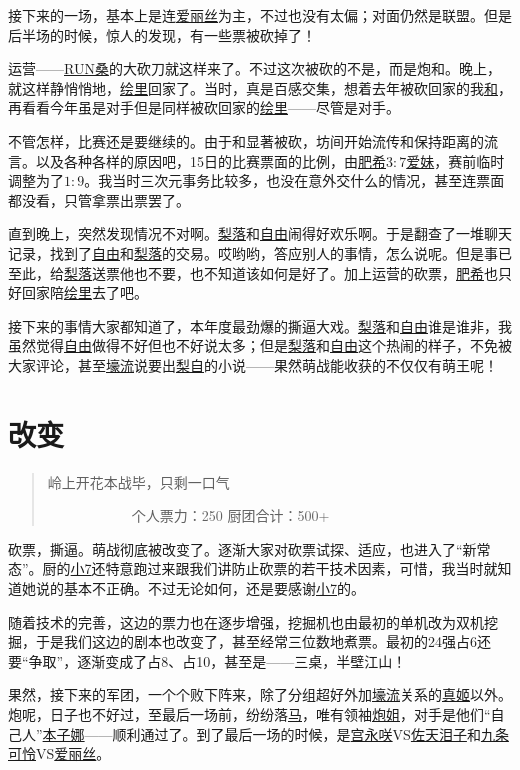 接下来的一场，基本上是连\uline{爱丽丝}为主，不过也没有太偏；对面仍然是联盟。但是后半场的时候，惊人的发现，有一些票被砍掉了！

运营——\uline{RUN桑}的大砍刀就这样来了。不过这次被砍的不是，而是炮和。晚上，就这样静悄悄地，\uline{绘里}回家了。当时，真是百感交集，想着去年被砍回家的我\uline{和}，再看看今年虽是对手但是同样被砍回家的\uline{绘里}——尽管是对手。

不管怎样，比赛还是要继续的。由于和显著被砍，坊间开始流传和保持距离的流言。以及各种各样的原因吧，15日的比赛票面的比例，由\uline{肥希}$3:7$\uline{爱妹}，赛前临时调整为了$1:9$。我当时三次元事务比较多，也没在意外交什么的情况，甚至连票面都没看，只管拿票出票罢了。

直到晚上，突然发现情况不对啊。\uline{梨落}和\uline{自由}闹得好欢乐啊。于是翻查了一堆聊天记录，找到了\uline{自由}和\uline{梨落}的交易。哎哟哟，答应别人的事情，怎么说呢。但是事已至此，给\uline{梨落}送票他也不要，也不知道该如何是好了。加上运营的砍票，\uline{肥希}也只好回家陪\uline{绘里}去了吧。

接下来的事情大家都知道了，本年度最劲爆的撕逼大戏。\uline{梨落}和\uline{自由}谁是谁非，我虽然觉得\uline{自由}做得不好但也不好说太多；但是\uline{梨落}和\uline{自由}这个热闹的样子，不免被大家评论，甚至\uline{壕流}说要出\uline{梨}\uline{自}的小说——果然萌战能收获的不仅仅有萌王呢！

\chapter{改变}
\begin{quote}
岭上开花本战毕，只剩一口气

　　　　　　个人票力：250 厨团合计：500+
\end{quote}

砍票，撕逼。萌战彻底被改变了。逐渐大家对砍票试探、适应，也进入了“新常态”。厨的\uline{小7}还特意跑过来跟我们讲防止砍票的若干技术因素，可惜，我当时就知道她说的基本不正确。不过无论如何，还是要感谢\uline{小7}的。

随着技术的完善，这边的票力也在逐步增强，挖掘机也由最初的单机改为双机挖掘，于是我们这边的剧本也改变了，甚至经常三位数地煮票。最初的24强占6还要“争取”，逐渐变成了占8、占10，甚至是——三桌，半壁江山！

果然，接下来的军团，一个个败下阵来，除了分组超好外加\uline{壕流}关系的\uline{真姬}以外。炮呢，日子也不好过，至最后一场前，纷纷落\uline{马}，唯有领袖\uline{炮姐}，对手是他们“自己人”\uline{本子娜}——顺利通过了。到了最后一场的时候，是\uline{宫永咲}VS\uline{佐天泪子}和\uline{九条可怜}VS\uline{爱丽丝}。

